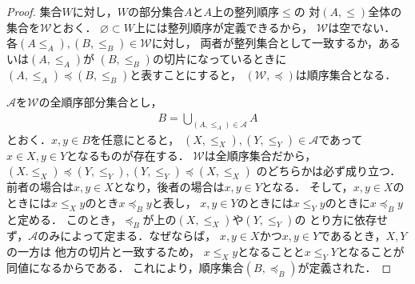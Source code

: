    \begin{proof}
     集合$W$に対し，$W$の部分集合$A$と$A$上の整列順序$\leq$の
     対$(A, {\leq} ) $全体の集合を$\mathscr{W}$とおく．
     $\varnothing \subset W$上には整列順序が定義できるから，
     $\mathscr{W}$は空でない．
     各$(A  {\leq_A}), (B, {\leq_B}) \in \mathscr{W}$に対し，
     両者が整列集合として一致するか，あるいは$(A, {\leq_A})$が
     $(B , {\leq_B})$の切片になっているときに
     $(A , {\leq_A} ) \preceq (B, {\leq_B})$と表すことにすると，
     $(\mathscr{W} , { \preceq})$は順序集合となる．

     $\mathscr{A}$を$\mathscr{W}$の全順序部分集合とし，
     \begin{align*}
       B = \bigcup_{ (A , {\leq_A}) \in \mathscr{A}} A 
     \end{align*}
     とおく．$x,y \in B$を任意にとると，
     $(X , {\leq_X}), (Y , {\leq_Y}) \in \mathscr{A}$であって
     $x \in X , y \in Y$となるものが存在する．
     $\mathscr{W}$は全順序集合だから，
     $(X. { \leq_X}) \preceq (Y , {\leq_Y}) , (Y , {\leq_Y}) \preceq (X , {\leq_X})$
     のどちらかは必ず成り立つ．
     前者の場合は$x,y \in X$となり，後者の場合は$x,y \in Y$となる．
     そして，$x,y \in X$のときには$x \leq_X y$のとき$x \preceq_B y$と表し，
     $x,y \in Y$のときには$x \leq_Y y$のときに$x \preceq_B y$と定める．
     このとき，$\preceq_B$が上の$(X ,{\leq_X})$や$(Y , {\leq_Y})$の
     とり方に依存せず，$\mathscr{A}$のみによって定まる．なぜならば，
     $x,y \in X$かつ$x,y \in Y$であるとき，$X,Y$の一方は
     他方の切片と一致するため，
     $x \leq_X y$となることと$x \leq_Y Y$となることが同値になるからである．
     これにより，順序集合$(B, \preceq _B)$が定義された．


\end{proof}
